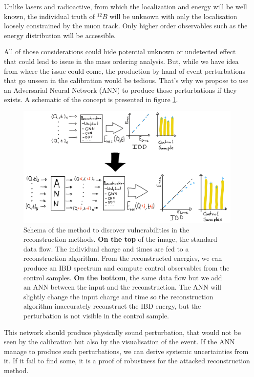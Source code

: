 \documentclass[../main.tex]{subfiles}
\begin{document}
Unlike lasers and radioactive, from which the localization and energy will be well known, the individual truth of $^{12}B$ will be unknown with only the localisation loosely constrained by the muon track. Only higher order observables such as the energy distribution will be accessible.

All of those considerations could hide potential unknown or undetected effect that could lead to issue in the mass ordering analysis. But, while we have idea from where the issue could come, the production by hand of event perturbations that go unseen in the calibration would be tedious. That's why we propose to use an Adversarial Neural Network (ANN) to produce those perturbations if they exists. A schematic of the concept is presented in figure \ref{fig:janne:method:schema}.

\begin{figure}[ht]
  \centering
  \includegraphics[width=\linewidth]{images/janne/ann_method.jpg}
  \caption{Schema of the method to discover vulnerabilities in the reconstruction methods. \textbf{On the top} of the image, the standard data flow. The individual charge and times are fed to a reconstruction algorithm. From the reconstructed energies, we can produce an IBD spectrum and compute control observables from the control samples. \textbf{On the bottom}, the same data flow but we add an ANN between the input and the reconstruction. The ANN will slightly change the input charge and time so the reconstruction algorithm inaccurately reconstruct the IBD energy, but the perturbation is not visible in the control sample.}
  \label{fig:janne:method:schema}
\end{figure}

This network should produce physically sound perturbation, that would not be seen by the calibration but also by the visualisation of the event. If the ANN manage to produce such perturbations, we can derive systemic uncertainties from it. If it fail to find some, it is a proof of robustness for the attacked reconstruction method.
\end{document}
